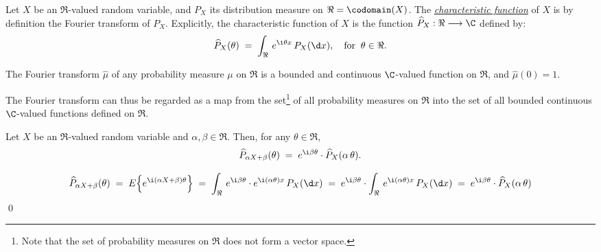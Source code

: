 \documentclass{article}
\begin{document}
\begin{definition} \mbox{} \vskip 0.1cm \noindent
Let $X$ be an $\Re$-valued random variable, and $P_{X}$ its distribution measure on $\Re = \codomain(X)$.  The \underline{\emph{characteristic function}} of $X$ is by definition the Fourier transform of $P_{X}$.  Explicitly, the characteristic function of $X$ is the function $\widehat{P}_{X} : \Re \longrightarrow \C$ defined by:
\begin{equation*}
\widehat{P}_{X}(\theta) \; = \; \int_{\Re} \, e^{\i\theta x} \, P_{X}(\d x),
\quad\textnormal{for}\;\; \theta \in \Re.
\end{equation*}
\end{definition}

\begin{theorem} \mbox{} \vskip 0.1cm \noindent
The Fourier transform $\widehat{\mu}$ of any probability measure $\mu$ on $\Re$ is a bounded and continuous $\C$-valued function on $\Re$, and $\widehat{\mu}(0) = 1$.
\end{theorem}

\begin{remark} \mbox{} \vskip 0.1cm \noindent
The Fourier transform can thus be regarded as a map from the set\footnote{Note that the set of probability measures on $\Re$ does not form a vector space.} of all probability measures on $\Re$ into the set of all bounded continuous $\C$-valued functions defined on $\Re$.
\end{remark}

\begin{theorem}\label{ChangeOfVariables} \mbox{} \vskip 0.1cm \noindent
Let $X$ be an $\Re$-valued random variable and $\alpha, \beta \in \Re$.  Then, for any $\theta \in \Re$,
\begin{equation*}
\widehat{P}_{\alpha X + \beta}(\theta) \; = \;
e^{\i\beta\theta}\cdot\widehat{P}_{X}(\alpha\,\theta).
\end{equation*}
\end{theorem}
\proof
\begin{equation*}
        \widehat{P}_{\alpha X + \beta}(\theta)
\;=\;  E\!\left\{e^{\i(\alpha X + \beta)\theta}\right\}
\;=\;  \int_{\Re}\, e^{\i\beta\theta} \cdot e^{\i(\alpha\theta)x}\,P_{X}(\d x)
\;=\;  e^{\i\beta\theta} \cdot \int_{\Re}\, e^{\i(\alpha\theta)x}\,P_{X}(\d x)
\;=\;  e^{\i\beta\theta}\cdot\widehat{P}_{X}(\alpha\,\theta)
\end{equation*}
\qed
\end{document}

